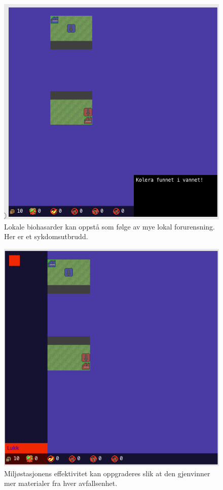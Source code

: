 \begin{center}
	\begin{figure}
		\includegraphics[width=\textwidth]{images/Kolera.png}
		\caption{Lokale biohasarder kan oppstå som følge av mye lokal forurensning. Her er et sykdomsutbrudd.}
		\label{fig:Kolera}
	\end{figure}
\end{center}

\begin{center}
	\begin{figure}
		\includegraphics[width=\textwidth]{images/OppgradereEnv.png}
		\caption{Miljøstasjonens effektivitet kan oppgraderes slik at den gjenvinner mer materialer fra hver avfallsenhet.}
		\label{fig:OppgradereEnv}
	\end{figure}
\end{center}



